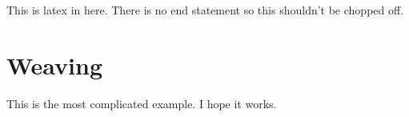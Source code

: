 \documentclass[letterpaper]{scrartcl}
\begin{document}
% 


This is latex in here.  There is no end statement so this shouldn't be chopped off.

    

\section{Weaving}
\label{sec:weaving}

This is the most complicated example.  I hope it works.

%

    
\end{document}
